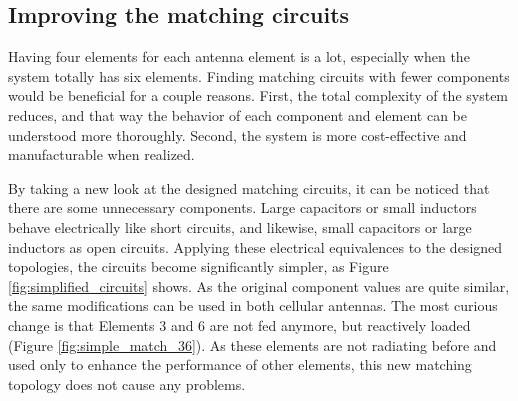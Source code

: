 \subsection{Improving the matching circuits}
\label{sec:matching_circuit}

Having four elements for each antenna element is a lot, especially when the system totally has six elements. Finding matching circuits with fewer components would be beneficial for a couple reasons. First, the total complexity of the system reduces, and that way the behavior of each component and element can be understood more thoroughly. Second, the system is more cost-effective and manufacturable when realized. 

By taking a new look at the designed matching circuits, it can be noticed that there are some unnecessary components. Large capacitors or small inductors behave electrically like short circuits, and likewise, small capacitors or large inductors as open circuits. Applying these electrical equivalences to the designed topologies, the circuits become significantly simpler, as Figure \ref{fig:simplified_circuits} shows. As the original component values are quite similar, the same modifications can be used in both cellular antennas. The most curious change is that Elements 3 and 6 are not fed anymore, but reactively loaded (Figure \ref{fig:simple_match_36}). As these elements are not radiating before and used only to enhance the performance of other elements, this new matching topology does not cause any problems. 

